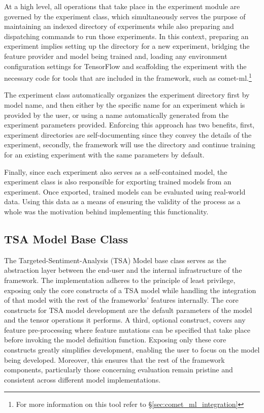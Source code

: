 \documentclass[../../fyp.tex]{subfiles}
\begin{document}
At a high level, all operations that take place in the experiment module are governed by the experiment class, which simultaneously serves the purpose of maintaining an indexed directory of experiments while also preparing and dispatching commands to run those experiments. In this context, preparing an experiment implies setting up the directory for a new experiment, bridging the feature provider and model being trained and, loading any environment configuration settings for TensorFlow and scaffolding the experiment with the necessary code for tools that are included in the framework, such as comet-ml.\footnote{For more information on this tool refer to \S\ref{sec:comet_ml_integration}} 

The experiment class automatically organizes the experiment directory first by model name, and then either by the specific name for an experiment which is provided by the user, or using a name automatically generated from the experiment parameters provided. Enforcing this approach has two benefits, first, experiment directories are self-documenting since they convey the details of the experiment, secondly, the framework will use the directory and continue training for an existing experiment with the same parameters by default.

Finally, since each experiment also serves as a self-contained model, the experiment class is also responsible for exporting trained models from an experiment. Once exported, trained models can be evaluated using real-world data. Using this data as a means of ensuring the validity of the process as a whole was the motivation behind implementing this functionality.

\subsection{TSA Model Base Class}
The Targeted-Sentiment-Analysis (TSA) Model base class serves as the abstraction layer between the end-user and the internal infrastructure of the framework. The implementation adheres to the principle of least privilege, exposing only the core constructs of a TSA model while handling the integration of that model with the rest of the frameworks' features internally. The core constructs for TSA model development are the default parameters of the model and the tensor operations it performs. A third, optional construct, covers any feature pre-processing where feature mutations can be specified that take place before invoking the model definition function. Exposing only these core constructs greatly simplifies development, enabling the user to focus on the model being developed. Moreover, this ensures that the rest of the framework components, particularly those concerning evaluation remain pristine and consistent across different model implementations. 
\end{document}
